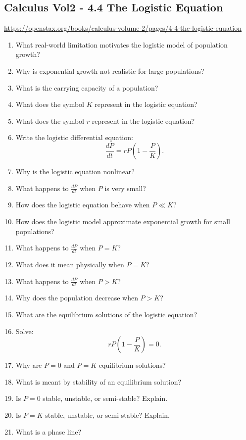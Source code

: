 \subsection{Calculus Vol2 - 4.4 The Logistic Equation}

\url{https://openstax.org/books/calculus-volume-2/pages/4-4-the-logistic-equation}

\begin{enumerate}
  \item What real-world limitation motivates the logistic model of population growth?
  \item Why is exponential growth not realistic for large populations?
  \item What is the carrying capacity of a population?
  \item What does the symbol \(K\) represent in the logistic equation?
  \item What does the symbol \(r\) represent in the logistic equation?
  \item Write the logistic differential equation:
    \[ \frac{dP}{dt}= rP\left(1 - \frac{P}{K}\right). \]
  \item Why is the logistic equation nonlinear?
  \item What happens to \(\frac{dP}{dt}\) when \(P\) is very small?
  \item How does the logistic equation behave when \(P \ll K\)?
  \item How does the logistic model approximate exponential growth for small populations?
  \item What happens to \(\frac{dP}{dt}\) when \(P = K\)?
  \item What does it mean physically when \(P = K\)?
  \item What happens to \(\frac{dP}{dt}\) when \(P > K\)?
  \item Why does the population decrease when \(P > K\)?
  \item What are the equilibrium solutions of the logistic equation?
  \item Solve:
    \[ rP\left(1 - \frac{P}{K}\right) = 0. \]
  \item Why are \(P=0\) and \(P=K\) equilibrium solutions?
  \item What is meant by stability of an equilibrium solution?
  \item Is \(P=0\) stable, unstable, or semi-stable? Explain.
  \item Is \(P=K\) stable, unstable, or semi-stable? Explain.
  \item What is a phase line?

\end{enumerate}
